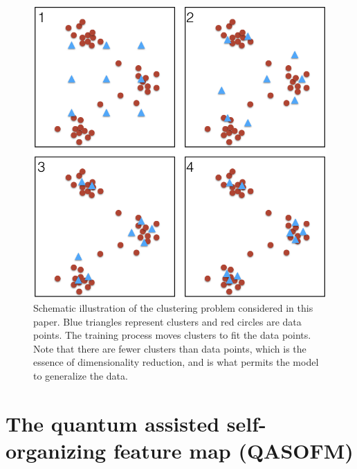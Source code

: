 \documentclass[pra,showkeys,twocolumn,showpacs,aps,10pt]{revtex4-1}
\begin{document}
\begin{figure}
    \includegraphics[width=0.95\columnwidth]{sofm_fitting.png}
  \caption{
    Schematic illustration of the clustering problem considered in this paper.
    Blue triangles represent clusters and red circles are data points.
    The training process moves clusters to fit the data points.
    Note that there are fewer clusters than data points,
    which is the essence of dimensionality reduction,
    and is what permits the model to generalize the data.
  }
  \label{fig:sofm_fitting}
\end{figure}


























\section{The quantum assisted self-organizing feature map (QASOFM)}
\label{sec:qasofm}
\end{document}
